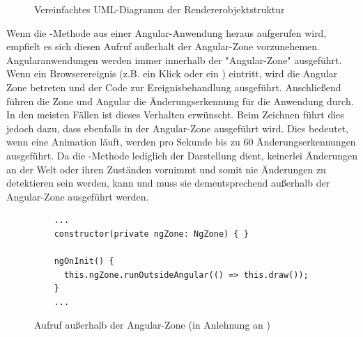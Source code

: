 \begin{figure}
  \caption{Vereinfachtes UML-Diagramm der Rendererobjektstruktur}
  \label{fig:implementation:rendering:uml}
\end{figure}

Wenn die -Methode aus einer Angular-Anwendung heraus aufgerufen wird, empfielt es sich diesen Aufruf außerhalt der Angular-Zone vorzunehemen. Angularanwendungen werden immer innerhalb der "Angular-Zone" ausgeführt. Wenn ein Browserereignis (z.B. ein Klick oder ein ) eintritt, wird die Angular Zone betreten und der Code zur Ereignisbehandlung ausgeführt. Anschließend führen die Zone und Angular die Änderungserkennung für die Anwendung durch. In den meisten Fällen ist dieses Verhalten erwünscht. Beim Zeichnen führt dies jedoch dazu, dass  ebenfalls in der Angular-Zone ausgeführt wird. Dies bedeutet, wenn eine Animation läuft, werden pro Sekunde bis zu 60 Änderungserkennungen ausgeführt. \cite{angular-canvas} Da die -Methode lediglich der Darstellung dient, keinerlei Änderungen an der Welt oder ihren Zuständen vornimmt und somit nie Änderungen zu detektieren sein werden, kann und muss sie dementsprechend außerhalb der Angular-Zone ausgeführt werden.

\begin{figure}
  \begin{lstlisting}
    ...
    constructor(private ngZone: NgZone) { }

    ngOnInit() {
      this.ngZone.runOutsideAngular(() => this.draw());
    }
    ...
  \end{lstlisting}
  \caption{Aufruf außerhalb der Angular-Zone (in Anlehnung an \cite{angular-canvas})}
  \label{fig:implementation:program:evaluation:while}
\end{figure}

